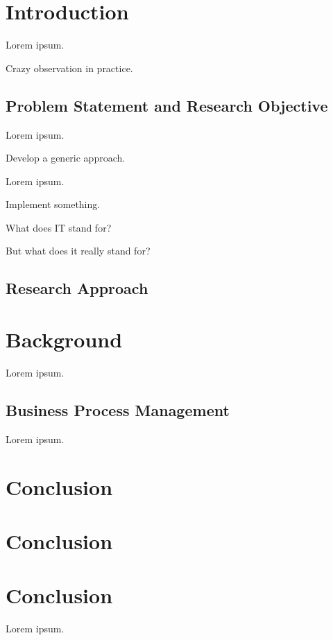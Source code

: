 \acresetall %

\chapter{Introduction}
\label{cha:introduction}

Lorem ipsum.
\begin{obs}
\label{obs:wow}
Crazy observation in practice.
\end{obs}


\section{Problem Statement and Research Objective}
\label{sec:introduction:research-objective}

Lorem ipsum.

\begin{reo}
	\label{ro:approach}
	Develop a generic approach.
\end{reo}

Lorem ipsum.

\begin{reo}
	\label{ro:implementation}
	Implement something.
\end{reo}

\begin{req}
	\label{rq:it}
	What does IT stand for?
\end{req}

\begin{req}
	\label{rq:it-really}
	But what does it really stand for?
\end{req}

\section{Research Approach}
\label{sec:introduction:research-approach}



\cleardoublepage

\chapter{Background}
\label{cha:background}

Lorem ipsum.




\section{Business Process Management}
\label{sec:background:bpm}

Lorem ipsum.


\cleardoublepage

\chapter{Conclusion}
\label{cha:research-design}

\chapter{Conclusion}
\label{cha:research-results}

\chapter{Conclusion}
\label{cha:conclusion}

Lorem ipsum.
